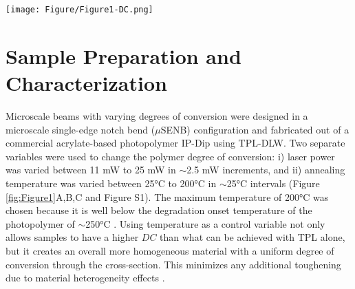 \documentclass[11pt]{article}
\providecommand{\um}[0]{$\mu m$}
\providecommand{\uSENB}[0]{$\mu$SENB}
\providecommand{\DC}[0]{$DC$}
\begin{document}
        \begin{figure*}[ht!]
                \texttt{[image: Figure/Figure1-DC.png]} 
                \caption{\textbf{Polymer Degree of Conversion (\DC{}):}
                A) Graphic rendering of the \uSENB{} design.
                B) Specimens with \DC{} values between 17-39\% generated using different laser exposures in TPL. 
                C) Specimens with starting \DC{} value = 17\% are heated under vacuum to generate specimens with \DC{} values between 17-80\%. Insets illustrate increasing cross-linking density.
                D) Raman spectra for specimens with three different \DC{} values showing the decreasing intensity of the C=C peak, which correlates to increased cross-linking between the polymeric chains.
                E) Raman data showing the effect of laser power and temperature on \DC{}.
                All scale bars = 10\um{}.}
                \label{fig:Figure1} 
        \end{figure*}
        
        
    \section{Sample Preparation and Characterization}
        Microscale beams with varying degrees of conversion were designed in a microscale single-edge notch bend (\uSENB) configuration and fabricated out of a commercial acrylate-based photopolymer IP-Dip using TPL-DLW.
        Two separate variables were used to change the polymer degree of conversion: i) laser power was varied between 11 mW to 25 mW in $\sim$2.5 mW increments, and ii) annealing temperature was varied between 25°C to 200°C in $\sim$25°C intervals (Figure \ref{fig:Figure1}A,B,C and Figure S1).
        The maximum temperature of 200°C was chosen because it is well below the degradation onset temperature of the photopolymer of $\sim$250°C \cite{bauer2020thermal}.
        Using temperature as a control variable not only allows samples to have a higher \DC{} than what can be achieved with TPL alone, but it creates an overall more homogeneous material with a uniform degree of conversion through the cross-section.
        This minimizes any additional toughening due to material heterogeneity effects \cite{patel2023toughness}.
\end{document}
